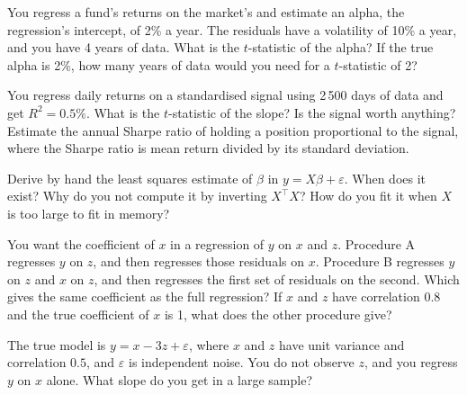 \begin{question}\label{iq:iv1:regression:5}
You regress a fund's returns on the market's and estimate an alpha, the regression's intercept, of 2\% a year. The residuals have a volatility of 10\% a year, and you have 4 years of data. What is the $t$-statistic of the alpha? If the true alpha is 2\%, how many years of data would you need for a $t$-statistic of 2?
\end{question}

\begin{question}\label{iq:iv1:regression:6}
You regress daily returns on a standardised signal using 2\,500 days of data and get $R^2 = 0.5\%$. What is the $t$-statistic of the slope? Is the signal worth anything? Estimate the annual Sharpe ratio of holding a position proportional to the signal, where the Sharpe ratio is mean return divided by its standard deviation.
\end{question}

\begin{question}\label{iq:iv1:regression:7}
Derive by hand the least squares estimate of $\beta$ in $y = X\beta + \varepsilon$. When does it exist? Why do you not compute it by inverting $X^\top X$? How do you fit it when $X$ is too large to fit in memory?
\end{question}

\begin{question}\label{iq:iv1:regression:8}
You want the coefficient of $x$ in a regression of $y$ on $x$ and $z$. Procedure A regresses $y$ on $z$, and then regresses those residuals on $x$. Procedure B regresses $y$ on $z$ and $x$ on $z$, and then regresses the first set of residuals on the second. Which gives the same coefficient as the full regression? If $x$ and $z$ have correlation $0.8$ and the true coefficient of $x$ is 1, what does the other procedure give?
\end{question}

\begin{question}\label{iq:iv1:regression:9}
The true model is $y = x - 3z + \varepsilon$, where $x$ and $z$ have unit variance and correlation $0.5$, and $\varepsilon$ is independent noise. You do not observe $z$, and you regress $y$ on $x$ alone. What slope do you get in a large sample?
\end{question}

